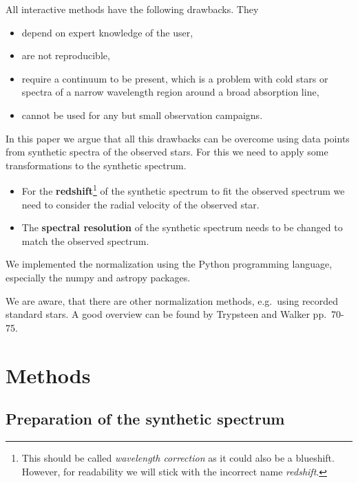 \documentclass[10pt,a4paper,notitlepage,twocolumn]{article}
\begin{document}
All interactive methods have the following drawbacks. They
\begin{itemize} %
	\item depend on expert knowledge of the user,
	\item are not reproducible,
	\item require a continuum to be present, which is a problem with cold stars or spectra of a narrow wavelength region around a broad absorption line,
	\item cannot be used for any but small observation campaigns.
\end{itemize}

In this paper we argue that all this drawbacks can be overcome using data points from synthetic spectra of the observed stars.
For this we need to apply some transformations to the synthetic spectrum.
\begin{itemize} %
	\item For the {\bf redshift}\footnote{This should be called {\em wavelength correction} as it could also be a blueshift. However, for readability we will stick with the incorrect name {\em redshift}.}  of the synthetic spectrum to fit the observed spectrum we need to consider the radial velocity of the observed star.
	\item The {\bf spectral resolution} of the synthetic spectrum needs to be changed to match the observed spectrum.
\end{itemize}

We implemented the normalization using the Python programming language, especially the numpy \cite{numpy} and astropy \cite{astropy:2013} \cite{astropy:2018} packages.

We are aware, that there are other normalization methods, e.g.\ using recorded standard stars. A good overview can be found by Trypsteen and Walker \cite{TrypsteenWalker2017} pp.\ 70-75.

\section{Methods}

\subsection{Preparation of the synthetic spectrum}
\end{document}

